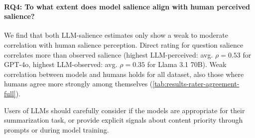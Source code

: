 \paragraph{RQ4: To what extent does model salience align with human perceived salience?}
\label{sec:results-human-alignment}
We find that both LLM-salience estimates only show a weak to moderate correlation with human salience perception.
Direct rating for question salience correlates more than observed salience (highest LLM-perceived: avg. $\rho = 0.53$ for GPT-4o, highest LLM-observed: avg. $\rho = 0.35$ for Llama 3.1 70B).
Weak correlation between models and humans holds for all dataset, also those where humans agree more strongly among themselves (\cref{tab:results-rater-agreement-full}).

Users of LLMs should carefully consider if the models are appropriate for their summarization task, or provide explicit signals about content priority through prompts or during model training.
